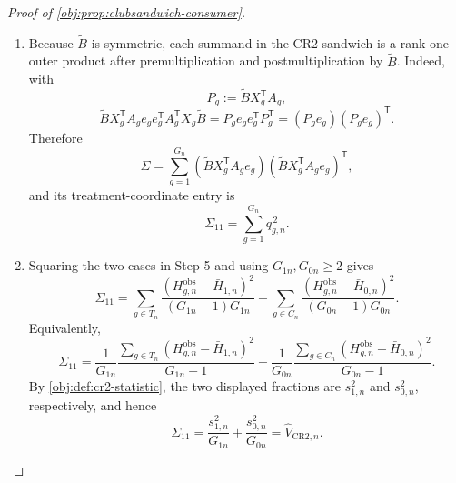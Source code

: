 \documentclass[11pt]{article}
\begin{document}
\begin{proof}[Proof of \cref{obj:prop:clubsandwich-consumer}]
\begin{enumerate}
\item
Because \(\widetilde B\) is symmetric, each summand in the CR2 sandwich is a
rank-one outer product after premultiplication and postmultiplication by
\(\widetilde B\).  Indeed, with
\[
P_g:=\widetilde B X_g^{\mathsf T}A_g,
\]
\[
\widetilde B X_g^{\mathsf T}A_ge_ge_g^{\mathsf T}A_g^{\mathsf T}X_g\widetilde B
=
P_ge_ge_g^{\mathsf T}P_g^{\mathsf T}
=
(P_ge_g)(P_ge_g)^{\mathsf T}.
\]
Therefore
\[
\Sigma
=
\sum_{g=1}^{G_n}
\left(\widetilde B X_g^{\mathsf T}A_ge_g\right)
\left(\widetilde B X_g^{\mathsf T}A_ge_g\right)^{\mathsf T},
\]
and its treatment-coordinate entry is
\[
\Sigma_{11}
=
\sum_{g=1}^{G_n}q_{g,n}^{\,2}.
\]

\item
Squaring the two cases in Step 5 and using \(G_{1n},G_{0n}\ge2\) gives
\[
\Sigma_{11}
=
\sum_{g\in T_n}
\frac{(H_{g,n}^{\mathrm{obs}}-\bar H_{1,n})^2}{(G_{1n}-1)G_{1n}}
+
\sum_{g\in C_n}
\frac{(H_{g,n}^{\mathrm{obs}}-\bar H_{0,n})^2}{(G_{0n}-1)G_{0n}}.
\]
Equivalently,
\[
\Sigma_{11}
=
\frac{1}{G_{1n}}
\frac{\sum_{g\in T_n}(H_{g,n}^{\mathrm{obs}}-\bar H_{1,n})^2}{G_{1n}-1}
+
\frac{1}{G_{0n}}
\frac{\sum_{g\in C_n}(H_{g,n}^{\mathrm{obs}}-\bar H_{0,n})^2}{G_{0n}-1}.
\]
By \cref{obj:def:cr2-statistic}, the two displayed fractions are
\(s_{1,n}^2\) and \(s_{0,n}^2\), respectively, and hence
\[
\Sigma_{11}
=
\frac{s_{1,n}^2}{G_{1n}}
+
\frac{s_{0,n}^2}{G_{0n}}
=
\widehat V_{\mathrm{CR2},n}.
\]
\end{enumerate}
\end{proof}
\end{document}
